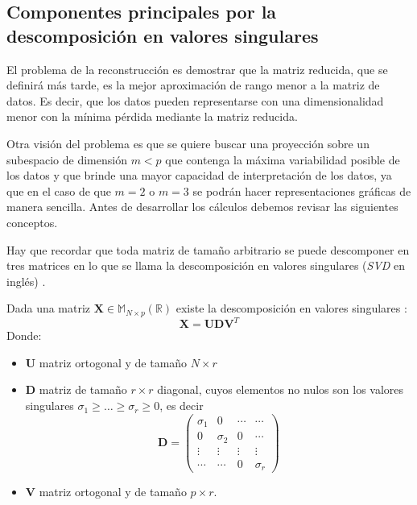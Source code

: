 \subsection{Componentes principales por la descomposición en valores singulares}
\noindent El problema de la reconstrucción es demostrar que la matriz reducida, que se definirá más tarde, es la mejor aproximación de rango menor a la matriz de datos. Es decir, que los datos pueden representarse con una dimensionalidad menor con la mínima pérdida mediante la matriz reducida.

\noindent Otra visión del problema es que se quiere buscar una proyección sobre un subespacio de dimensión $m<p$ que contenga la máxima variabilidad posible de los datos y que brinde una mayor capacidad de interpretación de los datos, ya que en el caso de que $m=2$ o $m=3$ se podrán hacer representaciones gráficas de manera sencilla. 
Antes de desarrollar los cálculos debemos revisar las siguientes conceptos.

\noindent Hay que recordar que toda matriz de tamaño arbitrario se puede descomponer en tres matrices en lo que se llama la descomposición en valores singulares (\textit{SVD} en inglés) \cite{Abdi 2010}.

\begin{defi}
Dada una matriz $\textbf{X}\in  \mathbb{M}_{N\times p}(\mathbb{R})$ existe la descomposición en valores singulares :
\begin{equation}
\textbf{X}=\textbf{U}\mathbf{D}\textbf{V}^T
\end{equation}
Donde: 
\begin{itemize}
\item \textbf{U} matriz ortogonal y de tamaño $N \times r$
\item $\mathbf{D}$ matriz de tamaño $r \times r$ diagonal, cuyos elementos no nulos son los valores singulares $\sigma_1\geq\ldots\geq \sigma_r\geq 0$, es decir
\begin{equation}
\mathbf{D}=\begin{pmatrix}
\sigma_1 & 0 & \cdots  & \cdots \\
0 & \sigma_2 & 0 & \cdots\\
\vdots & \vdots & \vdots & \vdots\\
\cdots & \cdots & 0 & \sigma_r
\end{pmatrix}
\end{equation}
\item \textbf{V} matriz ortogonal y de tamaño $p \times r$. 
\end{itemize}
\end{defi}

